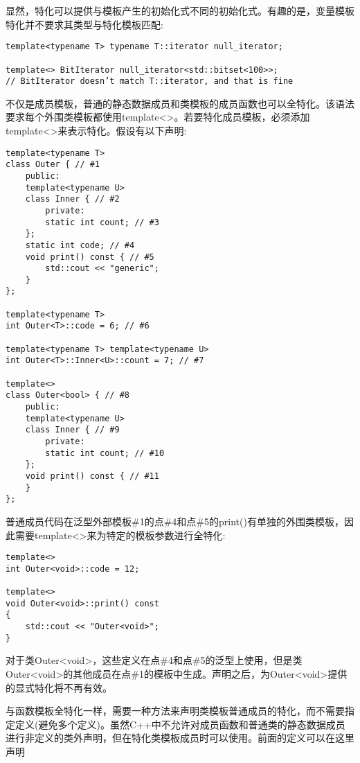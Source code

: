 显然，特化可以提供与模板产生的初始化式不同的初始化式。有趣的是，变量模板特化并不要求其类型与特化模板匹配:

\begin{lstlisting}[style=styleCXX]
template<typename T> typename T::iterator null_iterator;

template<> BitIterator null_iterator<std::bitset<100>>;
// BitIterator doesn’t match T::iterator, and that is fine
\end{lstlisting}


不仅是成员模板，普通的静态数据成员和类模板的成员函数也可以全特化。该语法要求每个外围类模板都使用template<>。若要特化成员模板，必须添加template<>来表示特化。假设有以下声明:

\begin{lstlisting}[style=styleCXX]
template<typename T>
class Outer { // #1
	public:
	template<typename U>
	class Inner { // #2
		private:
		static int count; // #3
	};
	static int code; // #4
	void print() const { // #5
		std::cout << "generic";
	}
};

template<typename T>
int Outer<T>::code = 6; // #6

template<typename T> template<typename U>
int Outer<T>::Inner<U>::count = 7; // #7

template<>
class Outer<bool> { // #8
	public:
	template<typename U>
	class Inner { // #9
		private:
		static int count; // #10
	};
	void print() const { // #11
	}
};
\end{lstlisting}

普通成员代码在泛型外部模板\#1的点\#4和点\#5的print()有单独的外围类模板，因此需要template<>来为特定的模板参数进行全特化:

\begin{lstlisting}[style=styleCXX]
template<>
int Outer<void>::code = 12;

template<>
void Outer<void>::print() const
{
	std::cout << "Outer<void>";
}
\end{lstlisting}

对于类Outer<void>，这些定义在点\#4和点\#5的泛型上使用，但是类Outer<void>的其他成员在点\#1的模板中生成。声明之后，为Outer<void>提供的显式特化将不再有效。

与函数模板全特化一样，需要一种方法来声明类模板普通成员的特化，而不需要指定定义(避免多个定义)。虽然C++中不允许对成员函数和普通类的静态数据成员进行非定义的类外声明，但在特化类模板成员时可以使用。前面的定义可以在这里声明

